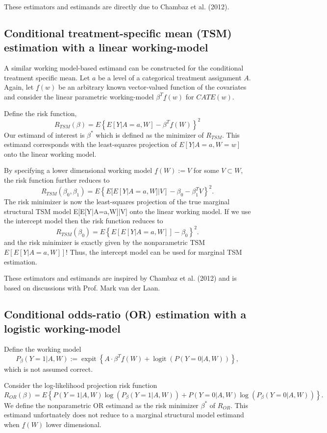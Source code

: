 \documentclass[article]{jss}
\DeclareMathOperator{\logit}{logit}
\DeclareMathOperator{\expit}{expit}
\begin{document}
These estimators and estimands are directly due to Chambaz et al. (2012).\nocite{ChambazLaanVarimp}

\subsection{Conditional treatment-specific mean (TSM) estimation with a linear working-model}
 

A similar working model-based estimand can be constructed for the conditional treatment specific mean. Let $a$ be a level of a categorical treatment assignment $A$. Again, let $\underline{f}(w)$ be an arbitrary known vector-valued function of the covariates and consider the linear parametric working-model $\beta^T \underline{f}(w)$ for $CATE(w)$. 

\noindent Define the risk function,
$$R_{TSM}(\beta) = E \left\{E[Y|A=a,W] -  \beta^T \underline{f}(W) \right\}^2$$
Our estimand of interest is $\beta^*$ which is defined as the minimizer of $R_{TSM}$. This estimand corresponds with the least-squares projection of $E[Y|A=a,W=w]$ onto the linear working model.

By specifying a lower dimensional working model $\underline{f}(W) := V$ for some $V \subset W$, the risk function further reduces to
$$R_{TSM}(\beta_0, \beta_1) = E \left\{E[E[Y|A=a,W]|V] - \beta_0 - \beta_1^T V \right\}^2.$$
The risk minimizer is now the least-squares projection of the true marginal structural TSM model E[E[Y|A=a,W]|V] onto the linear working model. If we use the intercept model then the risk function reduces to
$$R_{TSM}(\beta_0) = E \left\{E[E[Y|A=a,W]] - \beta_0  \right\}^2.$$
and the risk minimizer is exactly given by the nonparametric TSM $E[E[Y|A=a,W]]$! Thus, the intercept model can be used for marginal TSM estimation.

These estimators and estimands are inspired by Chambaz et al. (2012) and is based on discussions with Prof. Mark van der Laan.\nocite{ChambazLaanVarimp}

\subsection{Conditional odds-ratio (OR) estimation with a logistic working-model}
Define the working model
$$P_{\beta}(Y=1|A,W) := \expit\left\{A \cdot \beta^T \underline{f}(W) + \logit(P(Y=0|A,W))\right\},$$
which is not assumed correct. 

\noindent Consider the log-likelihood projection risk function
$$R_{OR}(\beta) = E \left\{P(Y=1|A,W)\log(P_{\beta}(Y=1|A,W)) + P(Y=0|A,W)\log(P_{\beta}(Y=0|A,W)) \right\}.$$
We define the nonparametric OR estimand as the risk minimizer $\beta^*$ of $R_{OR}$. This estimand unfortnately does not reduce to a marginal structural model estimand when $\underline{f}(W)$ lower dimensional.
\end{document}
